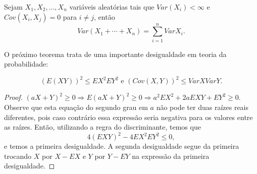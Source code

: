 \begin{frame}
%
%
\begin{corol}
Sejam $X_1,X_2,\ldots,X_n$ variáveis aleatórias tais que $Var(X_i)<\infty$ e $Cov(X_i,X_j)=0$ para $i\ne j$, então
$$Var(X_1+\cdots+X_n)=\sum_{i=1}^{n}Var X_i.$$
\end{corol}
%
O próximo teorema trata de uma importante desigualdade em teoria da
probabilidade:

\begin{teo} $$(E(XY))^2\leq EX^2EY^2\mbox{ e }(Cov(X,Y))^2\leq Var XVar Y.$$
\end{teo}
%
\begin{proof}
$(aX+Y)^2\geq 0\Rightarrow E(aX+Y)^2\geq 0\Rightarrow
a^2EX^2+2aEXY+EY^2\geq 0$. Observe que esta equação do segundo grau
em $a$ não pode ter duas raízes reais diferentes, pois caso
contrário essa expressão seria negativa para os valores entre as
raízes. Então, utilizando a regra do discriminante, temos que
$$4(EXY)^2-4EX^2EY^2\leq 0,$$
e temos a primeira desigualdade. A segunda desigualdade segue da
primeira trocando $X$ por $X-EX$ e $Y$ por $Y-EY$ na expressão da
primeira desigualdade. 
\end{proof}
\end{frame}
%
